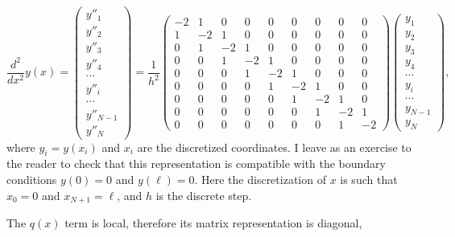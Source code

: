 \begin{equation}
\dfrac{d^2}{dx^2}y(x) = 
 \begin{pmatrix}
  y''_1 \\y''_2 \\ y''_3 \\ y''_4 \\ \cdots \\ y''_i \\ \cdots \\ y''_{N-1} \\ y''_N
 \end{pmatrix}
 = \dfrac{1}{h^2}
\begin{pmatrix} 
 -2 & 1 & 0 & 0 & 0 & 0 & 0 & 0 & 0\\
 1 & -2 & 1 & 0 & 0 & 0 & 0 & 0 & 0\\
 0 & 1 & -2 & 1 & 0 & 0 & 0 & 0 & 0\\
 0 & 0 & 1 & -2 & 1 & 0 & 0 & 0 & 0\\
 0 & 0 & 0 & 1 & -2 & 1 & 0 & 0 & 0\\
 0 & 0 & 0 & 0 & 1 & -2 & 1 & 0 & 0\\
 0 & 0 & 0 & 0 & 0 & 1 & -2 & 1 & 0\\
 0 & 0 & 0 & 0 & 0 & 0 & 1 & -2 & 1\\
 0 & 0 & 0 & 0 & 0 & 0 & 0 & 1 & -2
\end{pmatrix}
\begin{pmatrix}
  y_1 \\y_2 \\ y_3 \\ y_4 \\ \cdots \\ y_i \\ \cdots \\ y_{N-1} \\ y_N
\end{pmatrix},
\end{equation}
where $y_i = y(x_i)$ and $x_i$ are the discretized coordinates.
I leave as an exercise to the reader to check that this representation is compatible with the boundary conditions $y(0) = 0$ and $y(\ell) = 0$. Here the discretization of $x$ is such that $x_0 = 0$ and $x_{N+1} = \ell$, and $h$ is the discrete step.

The $q(x)$ term is local, therefore its matrix representation is diagonal,

